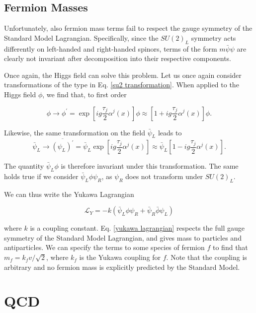 \documentclass[10pt,a4paper]{book}
\begin{document}
\subsection{Fermion Masses}

Unfortunately, also fermion mass terms fail to respect the gauge symmetry of the Standard Model Lagrangian. Specifically, since the $SU(2)_L$ symmetry acts differently on left-handed and right-handed spinors, terms of the form $m\bar{\psi}\psi$ are clearly not invariant after decomposition into their respective components. 

Once again, the Higgs field can solve this problem. Let us once again consider transformations of the type in Eq. \ref{su2 transformation}. When applied to the Higgs field $\phi$, we find that, to first order

\begin{equation}
    \phi \rightarrow \phi^\prime = \exp[ig\frac{\tau_j}{2}\alpha^j(x)]\phi \approx [1 + ig\frac{\tau_j}{2}\alpha^j(x)]\phi.
\end{equation}

Likewise, the same transformation on the field $\bar{\psi}_L$ leads to
\begin{equation}
    \bar{\psi}_L \rightarrow \overline{(\psi_L)^\prime} = \bar{\psi}_L\exp[ig\frac{\tau_j}{2}\alpha^j(x)] \approx \bar{\psi}_L[1 - ig\frac{\tau_j}{2}\alpha^j(x)].
\end{equation}

The quantity $\bar{\psi}_L\phi$ is therefore invariant under this transformation. The same holds true if we consider $\bar{\psi}_L\phi\psi_R$, as $\psi_R$ does not transform under $SU(2)_L$.

We can thus write the Yukawa Lagrangian

\begin{equation}
    \mathcal{L}_Y = -k(\bar{\psi}_L\phi\psi_R + \bar{\psi}_R\bar{\phi}\psi_L)
    \label{yukawa lagrangian}
\end{equation}

where $k$ is a coupling constant. Eq. \ref{yukawa lagrangian} respects the full gauge symmetry of the Standard Model Lagrangian, and gives mass to particles and antiparticles. We can specify the terms to some species of fermion $f$ to find that $m_f = k_fv/\sqrt{2}$, where $k_f$ is the Yukawa coupling for $f$. Note that the coupling is arbitrary and no fermion mass is explicitly predicted by the Standard Model.

\section{QCD}
\end{document}
